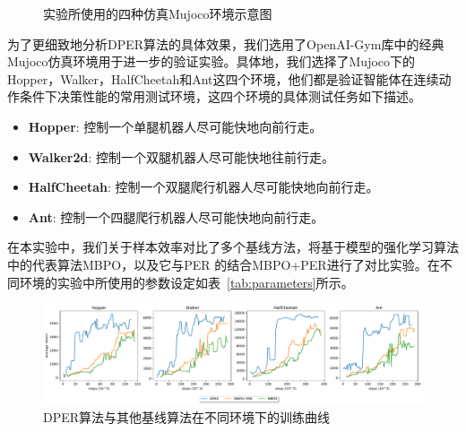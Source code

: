 \begin{figure}[t]
{        \label{fig:cheetah}
    }
    \caption{实验所使用的四种仿真Mujoco环境示意图}
    \label{fig:env-figures}
\end{figure}

为了更细致地分析DPER算法的具体效果，我们选用了OpenAI-Gym库中的经典Mujoco仿真环境\cite{todorov2012mujoco}用于进一步的验证实验。具体地，我们选择了Mujoco下的Hopper，Walker，HalfCheetah和Ant这四个环境，他们都是验证智能体在连续动作条件下决策性能的常用测试环境，这四个环境的具体测试任务如下描述。

\begin{itemize}
    \item \textbf{Hopper}: 控制一个单腿机器人尽可能快地向前行走。
    \item \textbf{Walker2d}: 控制一个双腿机器人尽可能快地往前行走。
    \item \textbf{HalfCheetah}: 控制一个双腿爬行机器人尽可能快地向前行走。
    \item \textbf{Ant}: 控制一个四腿爬行机器人尽可能快地向前行走。
\end{itemize}

在本实验中，我们关于样本效率对比了多个基线方法，将基于模型的强化学习算法中的代表算法MBPO\cite{janner2019trust}，以及它与PER \cite{schaul2016prioritized}的结合MBPO+PER进行了对比实验。在不同环境的实验中所使用的参数设定如表~\ref{tab:parameters}所示。

\begin{figure}[t]
  \centering
  \includegraphics[width=\textwidth]{figures/dler.pdf}
  \caption{DPER算法与其他基线算法在不同环境下的训练曲线}
  \label{fig:dper-performance}
\end{figure}

